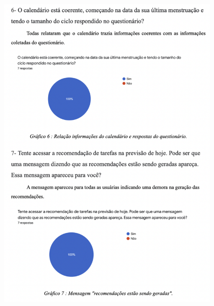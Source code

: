 \begin{apendicesenv}
\begin{figure}[ht]
        \includegraphics[keepaspectratio=true,scale=0.8]{figuras/ap4.png}
    \end{figure}
    \begin{figure}[ht]
        \centering

\end{figure}
\end{apendicesenv}
